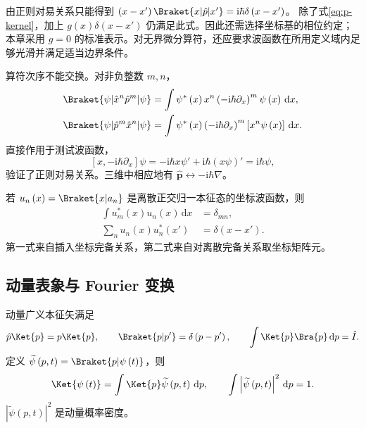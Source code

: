 \begin{remark}
由正则对易关系只能得到
$\left(x-x'\right)\Braket{x|\hat p|x'}=\mathrm{i}\hbar\delta\left(x-x'\right)$。
除了式\eqref{eq:p-kernel}，加上 $g\left(x\right)\delta\left(x-x'\right)$ 仍满足此式。因此还需选择坐标基的相位约定；本章采用 $g=0$ 的标准表示。对无界微分算符，还应要求波函数在所用定义域内足够光滑并满足适当边界条件。
\end{remark}

算符次序不能交换。对非负整数 $m,n$，
\begin{align}
\Braket{\psi|\hat x^n\hat p^m|\psi}
&=\int\psi^*\left(x\right)x^n\left(-\mathrm{i}\hbar\partial_x\right)^m\psi\left(x\right)\,\mathrm{d}x,\\
\Braket{\psi|\hat p^m\hat x^n|\psi}
&=\int\psi^*\left(x\right)\left(-\mathrm{i}\hbar\partial_x\right)^m\left[x^n\psi\left(x\right)\right]\,\mathrm{d}x.
\end{align}
直接作用于测试波函数，
\begin{equation}
\left[x,-\mathrm{i}\hbar\partial_x\right]\psi
=-\mathrm{i}\hbar x\psi'+\mathrm{i}\hbar\left(x\psi\right)'=\mathrm{i}\hbar\psi,
\end{equation}
验证了正则对易关系。三维中相应地有
$\hat{\bm p}\leftrightarrow-\mathrm{i}\hbar\nabla$。

若 $u_n\left(x\right)=\Braket{x|a_n}$ 是离散正交归一本征态的坐标波函数，则
\begin{align}
\int u_m^*\left(x\right)u_n\left(x\right)\,\mathrm{d}x&=\delta_{mn},\\
\sum_n u_n\left(x\right)u_n^*\left(x'\right)&=\delta\left(x-x'\right).
\end{align}
第一式来自插入坐标完备关系，第二式来自对离散完备关系取坐标矩阵元。

\subsection{动量表象与 Fourier 变换}
动量广义本征矢满足
\begin{equation}
\hat p\Ket{p}=p\Ket{p},\qquad
\Braket{p|p'}=\delta\left(p-p'\right),\qquad
\int\Ket{p}\Bra{p}\,\mathrm{d}p=\hat I.
\end{equation}
定义 $\widetilde\psi\left(p,t\right)=\Braket{p|\psi\left(t\right)}$，则
\begin{equation}
\Ket{\psi\left(t\right)}=\int\Ket{p}\widetilde\psi\left(p,t\right)\,\mathrm{d}p,
\qquad\int\left|\widetilde\psi\left(p,t\right)\right|^2\,\mathrm{d}p=1.
\end{equation}
$\left|\widetilde\psi\left(p,t\right)\right|^2$ 是动量概率密度。

